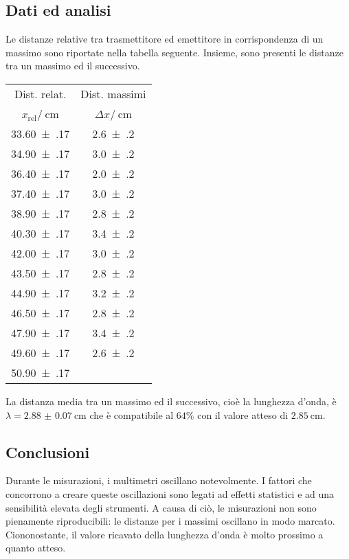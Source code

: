 \documentclass[a4paper]{article}
\begin{document}
\subsection{Dati ed analisi}
Le distanze relative tra trasmettitore ed emettitore in corrispondenza di un massimo sono riportate nella tabella seguente. Insieme, sono presenti le distanze tra un massimo ed il successivo.
\begin{center}
\begin{tabular}[h]{c|c}
	Dist. relat. & Dist. massimi \\
	$x_\text{rel} $/$\SI{}{\cm}$ & $\Delta x$/$\SI{}{\cm}$ \\\midrule
	\SI{33.60(17)}{} & \SI{2.6(2)}{} \\
	\SI{34.90(17)}{} & \SI{3.0(2)}{} \\
	\SI{36.40(17)}{} & \SI{2.0(2)}{} \\
	\SI{37.40(17)}{} & \SI{3.0(2)}{} \\
	\SI{38.90(17)}{} & \SI{2.8(2)}{} \\
	\SI{40.30(17)}{} & \SI{3.4(2)}{} \\
	\SI{42.00(17)}{} & \SI{3.0(2)}{} \\
	\SI{43.50(17)}{} & \SI{2.8(2)}{} \\
	\SI{44.90(17)}{} & \SI{3.2(2)}{} \\
	\SI{46.50(17)}{} & \SI{2.8(2)}{} \\
	\SI{47.90(17)}{} & \SI{3.4(2)}{} \\
	\SI{49.60(17)}{} & \SI{2.6(2)}{} \\
	\SI{50.90(17)}{} & \\
\end{tabular}
\end{center}
La distanza media tra un massimo ed il successivo, cioè la lunghezza d'onda, è $\lambda=\SI{2.88(7)}{\cm}$ che è compatibile al $64\%$ con il valore atteso di $\SI{2.85}{\cm}$.

\subsection{Conclusioni}
Durante le misurazioni, i multimetri oscillano notevolmente. I fattori che concorrono a creare queste oscillazioni sono legati ad effetti statistici e ad una sensibilità elevata degli strumenti. A causa di ciò, le misurazioni non sono pienamente riproducibili: le distanze per i massimi oscillano in modo marcato. Ciononostante, il valore ricavato della lunghezza d'onda è molto prossimo a quanto atteso.
\end{document}
